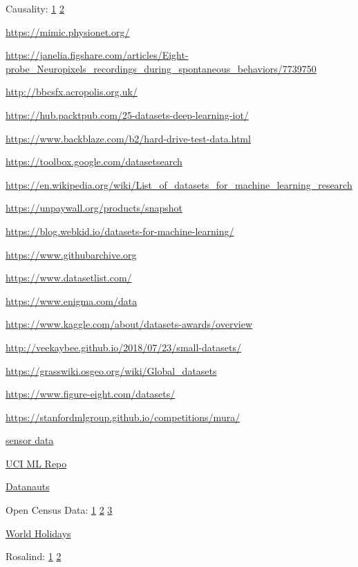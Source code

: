 \documentclass[]{book}
\begin{document}
Causality: \href{https://www.kaggle.com/c/cause-effect-pairs}{1}
\href{http://webdav.tuebingen.mpg.de/cause-effect/}{2}

\url{https://mimic.physionet.org/}

\url{https://janelia.figshare.com/articles/Eight-probe_Neuropixels_recordings_during_spontaneous_behaviors/7739750}

\url{http://bbcsfx.acropolis.org.uk/}

\url{https://hub.packtpub.com/25-datasets-deep-learning-iot/}

\url{https://www.backblaze.com/b2/hard-drive-test-data.html}

\url{https://toolbox.google.com/datasetsearch}

\url{https://en.wikipedia.org/wiki/List_of_datasets_for_machine_learning_research}

\url{https://unpaywall.org/products/snapshot}

\url{https://blog.webkid.io/datasets-for-machine-learning/}

\url{https://www.githubarchive.org}

\url{https://www.datasetlist.com/}

\url{https://www.enigma.com/data}

\url{https://www.kaggle.com/about/datasets-awards/overview}

\url{http://veekaybee.github.io/2018/07/23/small-datasets/}

\url{https://grasswiki.osgeo.org/wiki/Global_datasets}

\url{https://www.figure-eight.com/datasets/}

\url{https://stanfordmlgroup.github.io/competitions/mura/}

\href{https://data.melbourne.vic.gov.au/Transport-Movement/Pedestrian-volume-updated-monthly-/b2ak-trbp}{sensor
data}

\href{http://archive.ics.uci.edu/ml/}{UCI ML Repo}

\href{https://open.nasa.gov/explore/datanauts/}{Datanauts}

Open Census Data:
\href{https://www.producthunt.com/posts/open-census-data}{1} \textbar{}
\href{https://www.safegraph.com/open-census-data?ref=producthunt}{2}
\textbar{} \href{https://docs.safegraph.com/docs/open-census-data}{3}

\href{https://date.nager.at/}{World Holidays}

Rosalind: \href{http://rosalind.info/problems/locations/}{1} \textbar{}
\href{https://github.com/mtarbit/Rosalind-Problems}{2}
\end{document}
